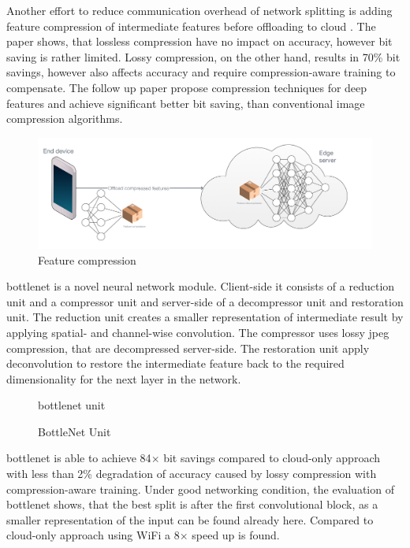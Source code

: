 Another effort to reduce communication overhead of network splitting is adding feature compression of intermediate features before offloading to cloud \cite{choi_deep_2018}. The paper shows, that lossless compression have no impact on accuracy, however bit saving is rather limited. Lossy compression, on the other hand, results in 70\% bit savings, however also affects accuracy and require compression-aware training to compensate. The follow up paper \cite{choi_near-lossless_2018} propose compression techniques for deep features and achieve significant better bit saving, than conventional image compression algorithms.

\begin{figure}
	\centering
	\includegraphics[width=\linewidth]{figures/models/compressed}
	\caption[Feature compression]{Feature compression}
\end{figure}

\gls{bottlenet} \cite{eshratifar_bottlenet:_2019} is a novel neural network module. Client-side it consists of a reduction unit and a compressor unit and server-side of a decompressor unit and restoration unit. The reduction unit creates a smaller representation of intermediate result by applying spatial- and channel-wise convolution. The compressor uses lossy \gls{jpeg} compression, that are decompressed server-side. The restoration unit apply deconvolution to restore the intermediate feature back to the required dimensionality for the next layer in the network.

\begin{figure}
	bottlenet unit
	\caption[BottleNet Unit]{BottleNet Unit}
\end{figure}

\gls{bottlenet} is able to achieve 84$\times$ bit savings compared to cloud-only approach with less than 2\% degradation of accuracy caused by lossy compression with compression-aware training. Under good networking condition, the evaluation of \gls{bottlenet} shows, that the best split is after the first convolutional block, as a smaller representation of the input can be found already here. Compared to cloud-only approach using WiFi a 8$\times$ speed up is found.

